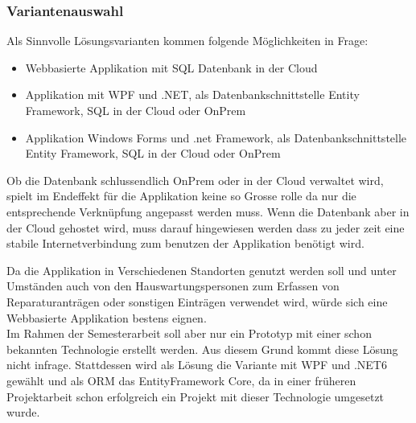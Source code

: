 \subsubsection{Variantenauswahl}
Als Sinnvolle Lösungsvarianten kommen folgende Möglichkeiten in Frage: 
\begin{itemize}
  \item Webbasierte Applikation mit SQL Datenbank in der Cloud
  \item Applikation mit WPF und .NET, als Datenbankschnittstelle Entity Framework, SQL in der Cloud oder OnPrem
  \item Applikation Windows Forms und .net Framework, als Datenbankschnittstelle Entity Framework, SQL in der Cloud oder OnPrem
\end{itemize}
Ob die Datenbank schlussendlich OnPrem oder in der Cloud verwaltet wird, spielt im Endeffekt für die Applikation keine so Grosse rolle da nur die entsprechende Verknüpfung angepasst werden muss. Wenn die Datenbank aber in der Cloud gehostet wird, muss darauf hingewiesen werden dass zu jeder zeit eine stabile Internetverbindung zum benutzen der Applikation benötigt wird.\\
\vspace*{1mm}

Da die Applikation in Verschiedenen Standorten genutzt werden soll und unter Umständen auch von den Hauswartungspersonen zum Erfassen von Reparaturanträgen oder sonstigen Einträgen verwendet wird, würde sich eine Webbasierte Applikation bestens eignen.\\
Im Rahmen der Semesterarbeit soll aber nur ein Prototyp mit einer schon bekannten Technologie erstellt werden. Aus diesem Grund kommt diese Lösung nicht infrage. Stattdessen wird als Lösung die Variante mit WPF und .NET6 gewählt und als ORM das EntityFramework Core, da in einer früheren Projektarbeit schon erfolgreich ein Projekt mit dieser Technologie umgesetzt wurde.